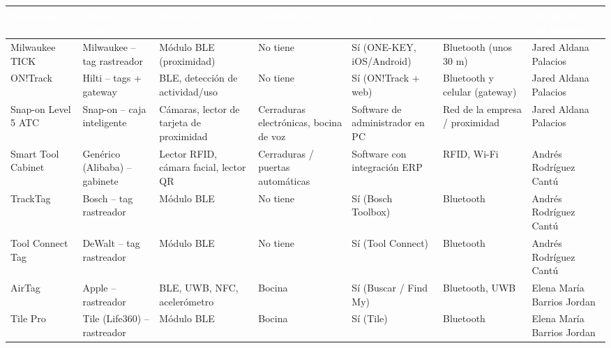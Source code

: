 \begin{table}[H]
\centering
{}
\small
\setlength{\tabcolsep}{3pt}
\begin{tabularx}{\textwidth}{|>{\raggedright\arraybackslash}X|>{\raggedright\arraybackslash}X|>{\raggedright\arraybackslash}X|>{\raggedright\arraybackslash}X|>{\raggedright\arraybackslash}X|>{\raggedright\arraybackslash}X|>{\raggedright\arraybackslash}X|}
\hline
\rowcolor{headerblue}
\centering\arraybackslash \textcolor{white}{\textbf{Tecnología}} &
\centering\arraybackslash \textcolor{white}{\textbf{Marca / Tipo}} &
\centering\arraybackslash \textcolor{white}{\textbf{Sensores}} &
\centering\arraybackslash \textcolor{white}{\textbf{Actuadores}} &
\centering\arraybackslash \textcolor{white}{\textbf{App}} &
\centering\arraybackslash \textcolor{white}{\textbf{Inalámbrico}} &
\centering\arraybackslash \textcolor{white}{\textbf{Integrante del equipo}} \\
\hline
Milwaukee TICK & Milwaukee – tag rastreador & Módulo BLE (proximidad) & No tiene & Sí (ONE-KEY, iOS/Android) & Bluetooth (unos 30 m) & Jared Aldana Palacios \\
\hline
ON!Track & Hilti – tags + gateway & BLE, detección de actividad/uso & No tiene & Sí (ON!Track + web) & Bluetooth y celular (gateway) & Jared Aldana Palacios \\
\hline
Snap-on Level 5 ATC & Snap-on – caja inteligente & Cámaras, lector de tarjeta de proximidad & Cerraduras electrónicas, bocina de voz & Software de administrador en PC & Red de la empresa / proximidad & Jared Aldana Palacios \\
\hline
Smart Tool Cabinet & Genérico (Alibaba) – gabinete & Lector RFID, cámara facial, lector QR & Cerraduras / puertas automáticas & Software con integración ERP & RFID, Wi-Fi & Andrés Rodríguez Cantú \\
\hline
TrackTag & Bosch – tag rastreador & Módulo BLE & No tiene & Sí (Bosch Toolbox) & Bluetooth & Andrés Rodríguez Cantú \\
\hline
Tool Connect Tag & DeWalt – tag rastreador & Módulo BLE & No tiene & Sí (Tool Connect) & Bluetooth & Andrés Rodríguez Cantú \\
\hline
AirTag & Apple – rastreador & BLE, UWB, NFC, acelerómetro & Bocina & Sí (Buscar / Find My) & Bluetooth, UWB & Elena María Barrios Jordan \\
\hline
Tile Pro & Tile (Life360) – rastreador & Módulo BLE & Bocina & Sí (Tile) & Bluetooth & Elena María Barrios Jordan \\

\end{tabularx}
\end{table}

